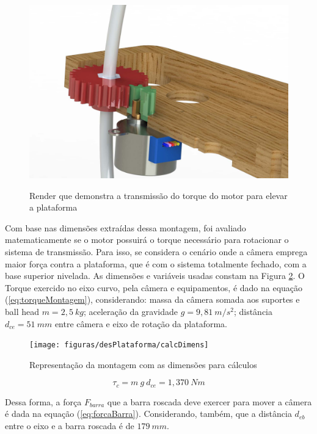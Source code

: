 \begin{figure}[!htb]
	\centering
	\caption{Render que demonstra a transmissão do torque do motor para elevar a plataforma}
	\includegraphics[width=.8\linewidth]{figuras/desPlataforma/transmissao}
	\label{fig:transmissao}
\end{figure}

Com base nas dimensões extraídas dessa montagem, foi avaliado matematicamente se o motor possuirá o torque necessário para rotacionar o sistema de transmissão. Para isso, se considera o cenário onde a câmera emprega maior força contra a plataforma, que é com o sistema totalmente fechado, com a base superior nivelada. As dimensões e variáveis usadas constam na Figura \ref{fig:calcDimens}. O Torque exercido no eixo curvo, pela câmera e equipamentos, é dado na equação (\ref{eq:torqueMontagem}), considerando: massa da câmera somada aos suportes e ball head $ m = 2,5~kg $; aceleração da gravidade $ g = 9,81~m/s^2 $; distância $ d_{ce} = 51~mm $ entre câmera e eixo de rotação da plataforma. 

\begin{figure}[!htb]
	\centering
	\caption{Representação da montagem com as dimensões para cálculos}
	\texttt{[image: figuras/desPlataforma/calcDimens]}
	\label{fig:calcDimens}
\end{figure}

\begin{equation}
	\tau_{c} = m~g~d_{ce} = 1,370~Nm
	\label{eq:torqueMontagem}
\end{equation}

Dessa forma, a força $ F_{barra} $ que a barra roscada deve exercer para mover a câmera é dada na equação (\ref{eq:forcaBarra}). Considerando, também,  que a distância $ d_{eb} $entre o eixo e a barra roscada é de $ 179~mm $.

